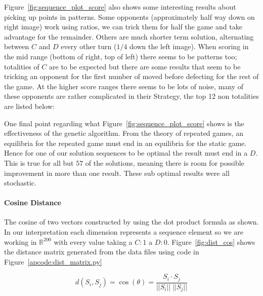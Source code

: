 Figure~\ref{fig:sequence_plot_score} also shows some interesting results about picking up points in patterns.
Some opponents (approximately half way down on right image) work using ratios, we can trick them for half the game and take advantage for the remainder.
Others are much shorter term solution, alternating between $C$ and $D$ every other turn ($1/4$ down the left image).
When scoring in the mid range (bottom of right, top of left) there seems to be patterns too; totalities of $C$ are to be expected but there are some results that seem to be tricking an opponent for the first number of moved before defecting for the rest of the game.
At the higher score ranges there seems to be lots of noise, many of these opponents are rather complicated in their Strategy, the top 12 non totalities are listed below:

One final point regarding what Figure~\ref{fig:sequence_plot_score} shows is the effectiveness of the genetic algorithm.
From the theory of repeated games, an equilibria for the repeated game must end in an equilibria for the static game.
Hence for one of our solution sequences to be optimal the result must end in a $D$. 
This is true for all but $57$ of the solutions, meaning there is room for possible improvement in more than one result.
These sub optimal results were all stochastic.

\paragraph{Cosine Distance}\cite{bora2014effect}
The cosine of two vectors constructed by using the dot product formula as shown.
In our interpretation each dimension represents a sequence element so we are working in $\mathbb{R}^{200}$ with every value taking a $C:1$ a $D:0$.
Figure~\ref{fig:dist_cos} shows the distance matrix generated from the data files using code in Figure~\ref{apcode:dist_matrix.py}

$$ d(S_i,S_j) = \cos(\theta) = \frac{{S_i} \cdot {S_j}}{|| {S_i} || \; || {S_j} ||} $$

